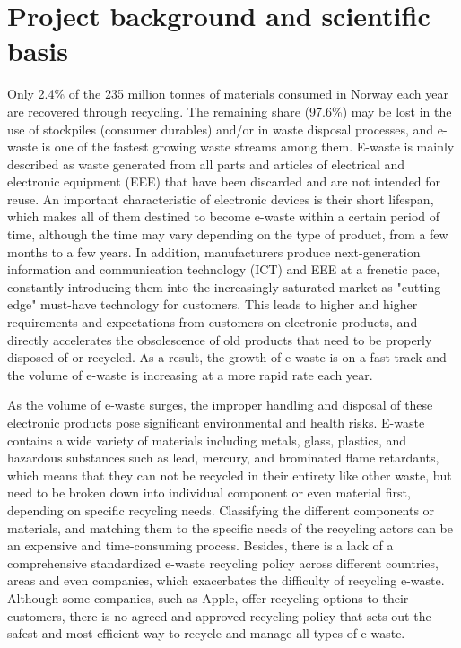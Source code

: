 \documentclass{article}
\numberwithin{equation}{section}
\begin{document}
\section{Project background and scientific basis}
Only 2.4\% of the 235 million tonnes of materials consumed in Norway each year are recovered through recycling. The remaining share (97.6\%) may be lost in the use of stockpiles (consumer durables) and/or in waste disposal processes, and e-waste is one of  the fastest growing waste streams among them. E-waste is mainly described as waste generated from all parts and articles of electrical and electronic equipment (EEE) that have been discarded and are not intended for reuse. An important characteristic of electronic devices is their short lifespan, which makes all of them destined to become e-waste within a certain period of time, although the time may vary depending on the type of product, from a few months to a few years. In addition, manufacturers produce next-generation information and communication technology (ICT) and EEE at a frenetic pace, constantly introducing them into the increasingly saturated market as "cutting-edge" must-have technology for customers. This leads to higher and higher requirements and expectations from customers on electronic products, and directly accelerates the obsolescence of old products that need to be properly disposed of or recycled. As a result, the growth of e-waste\cite{Forti20} is on a fast track and the volume of e-waste is increasing at a more rapid rate each year.

As the volume of e-waste surges, the improper handling and disposal \cite{Shaha22}of these electronic products pose significant environmental and health risks. E-waste contains a wide variety of materials including metals, glass, plastics, and hazardous substances such as lead, mercury, and brominated flame retardants, which means that they can not be recycled in their entirety like other waste, but need to be broken down into individual component or even material first, depending on specific recycling needs. Classifying the different components or materials, and matching them to the specific needs of the recycling actors can be an expensive and time-consuming process. Besides, there is a lack of a comprehensive standardized e-waste recycling policy\cite{why22} across different countries, areas and even companies, which exacerbates the difficulty of recycling e-waste. Although some companies, such as Apple, offer recycling options to their customers, there is no agreed and approved recycling policy that sets out the safest and most efficient way to recycle and manage all types of e-waste. 
\end{document}
